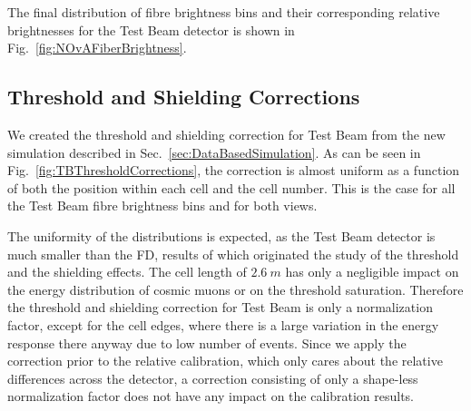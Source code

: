 The final distribution of fibre brightness bins and their corresponding relative brightnesses for the Test Beam detector is shown in Fig.~\ref{fig:NOvAFiberBrightness}.

\subsection{Threshold and Shielding Corrections}
We created the threshold and shielding correction for Test Beam from the new simulation described in Sec.~\ref{sec:DataBasedSimulation}. As can be seen in Fig.~\ref{fig:TBThresholdCorrections}, the correction is almost uniform as a function of both the position within each cell and the cell number. This is the case for all the Test Beam fibre brightness bins and for both views.

The uniformity of the distributions is expected, as the Test Beam detector is much smaller than the \gls{FD}, results of which originated the study of the threshold and the shielding effects. The cell length of $2.6\ \unit{m}$ has only a negligible impact on the energy distribution of cosmic muons or on the threshold saturation. Therefore the threshold and shielding correction for Test Beam is only a normalization factor, except for the cell edges, where there is a large variation in the energy response there anyway due to low number of events. Since we apply the correction prior to the relative calibration, which only cares about the relative differences across the detector, a correction consisting of only a shape-less normalization factor does not have any impact on the calibration results.
 
